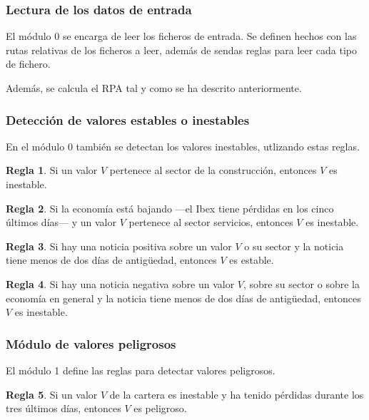 \documentclass[a4paper, 11pt, titlepage]{article}
\theoremstyle{definition}
\newtheorem{regla}{Regla}
\begin{document}
  \subsubsection*{Lectura de los datos de entrada}
  El módulo 0 se encarga de leer los ficheros de entrada. Se definen hechos
  con las rutas relativas de los ficheros a leer, además de sendas reglas para
  leer cada tipo de fichero.

  Además, se calcula el RPA tal y como se ha descrito anteriormente.

  \subsubsection*{Detección de valores estables o inestables}
  En el módulo 0 también se detectan los valores inestables, utlizando estas reglas.

  \begin{regla}
        Si un valor $V$ pertenece al sector de la construcción, entonces $V$ es inestable.
    \end{regla}

    \begin{regla}
        Si la economía está bajando ---el Ibex tiene pérdidas en los cinco últimos días--- y un valor $V$ pertenece al sector servicios, entonces $V$ es inestable.
    \end{regla}

    \begin{regla}
        Si hay una noticia positiva sobre un valor $V$ o su sector y la noticia tiene menos de dos días de antigüedad, entonces $V$ es estable.
    \end{regla}

    \begin{regla}
        Si hay una noticia negativa sobre un valor $V$, sobre su sector o sobre la economía en general y la noticia tiene menos de dos días de antigüedad, entonces $V$ es inestable.
    \end{regla}


  \subsubsection{Módulo de valores peligrosos}
  El módulo 1 define las reglas para detectar valores peligrosos.

  \begin{regla}
        Si un valor $V$ de la cartera es inestable y ha tenido pérdidas durante los tres últimos días, entonces $V$ es peligroso.
    \end{regla}
\end{document}
